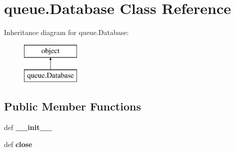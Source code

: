 \hypertarget{classqueue_1_1_database}{\section{queue.\-Database Class Reference}
\label{classqueue_1_1_database}
}
Inheritance diagram for queue.\-Database\-:\begin{figure}[H]
\begin{center}
\leavevmode
\includegraphics[height=2.000000cm]{classqueue_1_1_database}
\end{center}
\end{figure}
\subsection*{Public Member Functions}
\begin{DoxyCompactItemize}
\item 
\hypertarget{classqueue_1_1_database_a3714f51f945fc4721ff38eecc6c7a6a1}{def {\bfseries \-\_\-\-\_\-init\-\_\-\-\_\-}}\label{classqueue_1_1_database_a3714f51f945fc4721ff38eecc6c7a6a1}

\item 
\hypertarget{classqueue_1_1_database_a451ff193184fb189e2202e24c65d24b3}{def {\bfseries close}}\label{classqueue_1_1_database_a451ff193184fb189e2202e24c65d24b3}

\end{DoxyCompactItemize}
